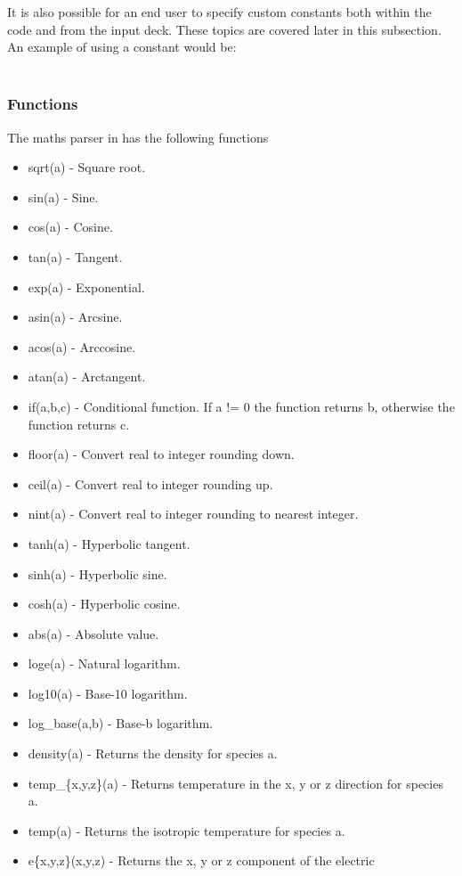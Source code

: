 It is also possible for an end user to specify custom constants both within
the code and from the input deck. These topics are covered later in this
subsection. An example of using a constant would be:\\
\indent{}\\

\subsubsection{Functions}
\label{sec:functions}
The maths parser in {\EPOCH} has the following functions
\begin{itemize}
\item sqrt(a) - Square root.
\item sin(a) - Sine.
\item cos(a) - Cosine.
\item tan(a) - Tangent.
\item exp(a) - Exponential.
\item asin(a) - Arcsine.
\item acos(a) - Arccosine.
\item atan(a) - Arctangent.
\item if(a,b,c) - Conditional function. If a != 0 the function returns b,
  otherwise the function returns c.
\item floor(a) - Convert real to integer rounding down.
\item ceil(a) - Convert real to integer rounding up.
\item nint(a) - Convert real to integer rounding to nearest integer.
\item tanh(a) - Hyperbolic tangent.
\item sinh(a) - Hyperbolic sine.
\item cosh(a) - Hyperbolic cosine.
\item abs(a) - Absolute value.
\item loge(a) - Natural logarithm.
\item log10(a) - Base-10 logarithm.
\item log\_base(a,b) - Base-b logarithm.
\item density(a) - Returns the density for species a.
\item temp\_\{x,y,z\}(a) - Returns temperature in the x, y or z direction for
    species a.
\item temp(a) - Returns the isotropic temperature for species a.
\item e\{x,y,z\}(x,y,z) - Returns the x, y or z component of the electric

\end{itemize}
